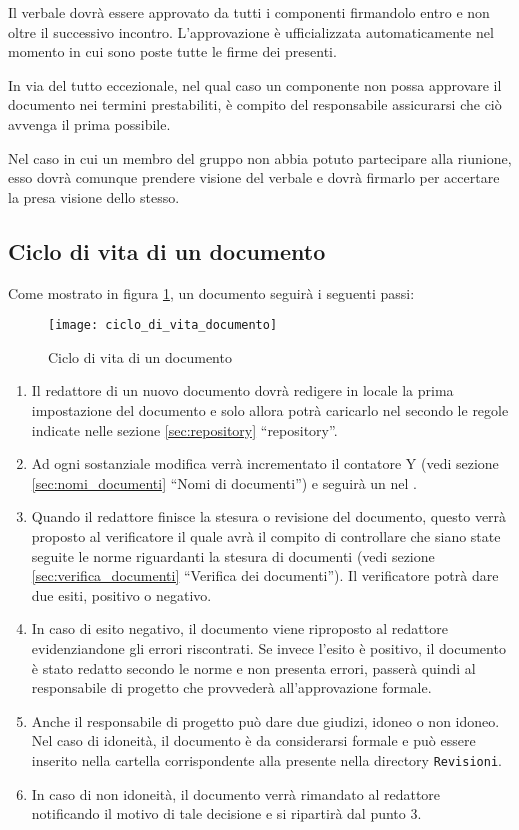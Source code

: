 \begin{itemize}
Il verbale dovrà essere approvato da tutti i componenti firmandolo entro e non oltre il successivo incontro. L'approvazione è ufficializzata automaticamente nel momento in cui sono poste tutte le firme dei presenti.

In via del tutto eccezionale, nel qual caso un componente non possa approvare il documento nei termini prestabiliti, è compito del responsabile assicurarsi che ciò avvenga il prima possibile.

Nel caso in cui un membro del gruppo non abbia potuto partecipare alla riunione, esso dovrà comunque prendere visione del verbale e dovrà firmarlo per accertare la presa visione dello stesso.
\end{itemize}

\subsection{Ciclo di vita di un documento}
Come mostrato in figura \ref{fig:ciclo_di_vita_documento}, un documento seguirà i seguenti passi:
\begin{figure}[h]
\centering
\texttt{[image: ciclo\_di\_vita\_documento]}
\caption{Ciclo di vita di un documento} \label{fig:ciclo_di_vita_documento}
\end{figure}
\begin{enumerate}
\item Il redattore di un nuovo documento dovrà redigere in locale la prima impostazione del documento e solo allora potrà caricarlo nel  secondo le regole indicate nelle sezione \ref{sec:repository} ``repository''.
\item Ad ogni sostanziale modifica verrà incrementato il contatore Y (vedi sezione \ref{sec:nomi_documenti} ``Nomi di documenti'') e seguirà un  nel .
\item Quando il redattore finisce la stesura o revisione del documento, questo verrà proposto al verificatore il quale avrà il compito di controllare che siano state seguite le norme riguardanti la stesura di documenti (vedi sezione \ref{sec:verifica_documenti} ``Verifica dei documenti''). Il verificatore potrà dare due esiti, positivo o negativo.
\item In caso di esito negativo, il documento viene riproposto al redattore evidenziandone gli errori riscontrati. Se invece l'esito è positivo, il documento è stato redatto secondo le norme e non presenta errori, passerà quindi al responsabile di progetto che provvederà all'approvazione formale.
\item Anche il responsabile di progetto può dare due giudizi, idoneo o non idoneo. Nel caso di idoneità, il documento è da considerarsi formale e può essere inserito nella cartella corrispondente alla  presente nella directory \verb+Revisioni+.
\item In caso di non idoneità, il documento verrà rimandato al redattore notificando il motivo di tale decisione e si ripartirà dal punto 3.
\end{enumerate}

